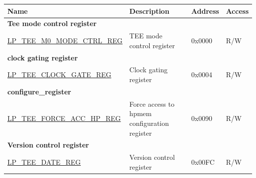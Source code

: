 \begin{longtable}{ | p{6cm} | p{7.2cm} | p{1.3cm} | p{1cm} | }
\hline\rowcolor{lightgray}
\textbf{Name} & \textbf{Description} &  \textbf{Address} & \textbf{Access} \\ \hline
\endhead
\multicolumn{4}{|l|}{\textbf{Tee mode control register}} \\ \hline
\hyperref[regdesc:LPTEEM0MODECTRLREG]{LP\_TEE\_M0\_MODE\_CTRL\_REG} & TEE mode control register & 0x0000 & R/W \\ \hline
\multicolumn{4}{|l|}{\textbf{clock gating register}} \\ \hline
\hyperref[regdesc:LPTEECLOCKGATEREG]{LP\_TEE\_CLOCK\_GATE\_REG} & Clock gating register & 0x0004 & R/W \\ \hline
\multicolumn{4}{|l|}{\textbf{configure\_register}} \\ \hline
\hyperref[regdesc:LPTEEFORCEACCHPREG]{LP\_TEE\_FORCE\_ACC\_HP\_REG} & Force access to hpmem configuration register & 0x0090 & R/W \\ \hline
\multicolumn{4}{|l|}{\textbf{Version control register}} \\ \hline
\hyperref[regdesc:LPTEEDATEREG]{LP\_TEE\_DATE\_REG} & Version control register & 0x00FC & R/W \\ \hline
\end{longtable}
